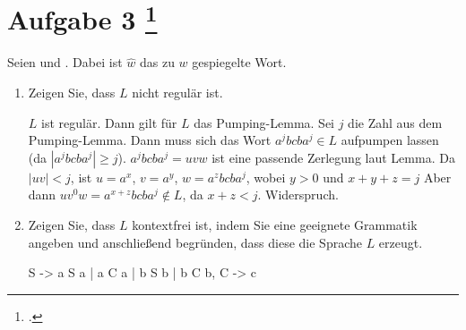 \documentclass{lehramt-informatik-aufgabe}
\begin{document}
\liAufgabenTitel{}
\section{Aufgabe 3
\footcite{66115:2020:09}}

Seien  und .
Dabei ist $\hat{w}$ das zu $w$ gespiegelte Wort.

\begin{enumerate}


\item Zeigen Sie, dass $L$ nicht regulär ist.

\begin{liAntwort}
$L$ ist regulär.
Dann gilt für $L$ das Pumping-Lemma.
Sei $j$ die Zahl aus
dem Pumping-Lemma.
Dann muss sich das Wort $a^j b c b a^j \in L$
aufpumpen lassen (da $|a^j b c b a^j| \geq j$).
$a^j b c b a^j = uvw$ ist eine passende Zerlegung laut Lemma.
Da $|uv| < j$, ist
$u = a^x$, $v = a^y$, $w = a^z b c b a^j$, wobei
$y > 0$ und
$x + y + z = j$
Aber dann
$u v^0 w= a^{x+z} b c b a^j \notin L$, da $x + z < j$.
Widerspruch.
\end{liAntwort}


\item Zeigen Sie, dass $L$ kontextfrei ist, indem Sie eine geeignete
Grammatik angeben und anschließend begründen, dass diese die Sprache $L$
erzeugt.

\begin{liAntwort}
\begin{liProduktionsRegeln}
S -> a S a | a C a | b S b | b C b,
C -> c
\end{liProduktionsRegeln}


\end{liAntwort}

\end{enumerate}
\end{document}
